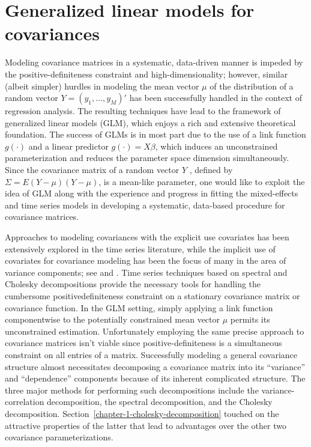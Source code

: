 \section{Generalized linear models for covariances}

Modeling covariance matrices in a systematic, data-driven manner is impeded by the positive-definiteness constraint and high-dimensionality; however, similar (albeit simpler) hurdles in modeling the mean vector $\mu$ of the distribution of a random vector $Y = \left(y_1, \dots , y_M\right)'$ has been successfully handled in the context of regression analysis. The resulting techniques have lead to the framework of generalized linear models (GLM), which enjoys a rich and extensive theoretical foundation. The success of GLMs is in most part due to the use of a  link function $g\left(\cdot\right)$ and a linear predictor $g\left(\cdot\right) = X\beta$, which induces an unconstrained parameterization and reduces the parameter space dimension simultaneously. Since the covariance matrix of a random vector $Y$ , defined by $\Sigma = E\left(Y - \mu\right)\left(Y - \mu\right)$, is a mean-like parameter, one would like to exploit the idea of GLM along with the experience and progress in fitting the mixed-effects and time series models in developing a systematic, data-based procedure for covariance matrices. 

\bigskip

Approaches to modeling covariances with the explicit use covariates has been extensively explored in the time series literature, while the implicit use of covariates for covariance modeling has been the focus of many in the area of variance components; see \cite{klein1997statistical} and \cite{searle2009variance}. Time series techniques based on spectral and Cholesky decompositions provide the necessary tools for handling the cumbersome positivedefiniteness constraint on a stationary covariance matrix or covariance function. In the GLM setting, simply  applying a link function componentwise to the potentially constrained mean vector $\mu$ permits its unconstrained estimation. Unfortunately employing the same precise approach to  covariance matrices isn't viable since positive-definiteness is a simultaneous constraint on all entries of a matrix. Successfully modeling a general covariance structure almost necessitates decomposing a covariance matrix into its ``variance'' and ``dependence'' components because of its inherent complicated structure.  The three major methods for performing such decompositions include the variance-correlation decomposition, the spectral decomposition, and the Cholesky decomposition. Section~\ref{chapter-1-cholesky-decomposition} touched on the attractive properties of the latter that lead to advantages over the other two covariance parameterizations. 

